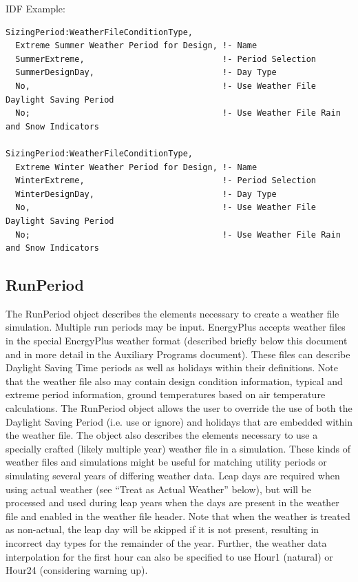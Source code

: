 IDF Example:

\begin{lstlisting}
SizingPeriod:WeatherFileConditionType,
  Extreme Summer Weather Period for Design, !- Name
  SummerExtreme,                            !- Period Selection
  SummerDesignDay,                          !- Day Type
  No,                                       !- Use Weather File Daylight Saving Period
  No;                                       !- Use Weather File Rain and Snow Indicators

SizingPeriod:WeatherFileConditionType,
  Extreme Winter Weather Period for Design, !- Name
  WinterExtreme,                            !- Period Selection
  WinterDesignDay,                          !- Day Type
  No,                                       !- Use Weather File Daylight Saving Period
  No;                                       !- Use Weather File Rain and Snow Indicators
\end{lstlisting}

\subsection{RunPeriod}\label{runperiod}

The RunPeriod object describes the elements necessary to create a weather file simulation. Multiple run
periods may be input. EnergyPlus accepts weather files in the special EnergyPlus weather format
(described briefly below this document and in more detail in the Auxiliary Programs document). These files
can describe Daylight Saving Time periods as well as holidays within their definitions. Note that the weather
file also may contain design condition information, typical and extreme period information, ground
temperatures based on air temperature calculations. The RunPeriod object allows the user to override the use
of both the Daylight Saving Period (i.e. use or ignore) and holidays that are embedded within the weather
file. The object also describes the elements necessary to use a specially crafted (likely multiple year)
weather file in a simulation. These kinds of weather files and simulations might be useful for matching
utility periods or simulating several years of differing weather data. Leap days are required when using
actual weather (see ``Treat as Actual Weather'' below), but will be processed and used during leap years
when the days are present in the weather file and enabled in the weather file header. Note that when the
weather is treated as non-actual, the leap day will be skipped if it is not present, resulting in incorrect
day types for the remainder of the year. Further, the weather data interpolation for the first hour can also be specified to use Hour1 (natural) or Hour24 (considering warning up). 

